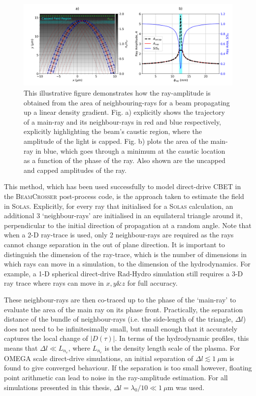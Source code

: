\begin{figure}[t!]
    \includegraphics[width=\linewidth]{Numerics/Images/FieldCap_Diagram.png}
    \centering
    \caption{This illustrative figure demonstrates how the ray-amplitude is obtained from the area of neighbouring-rays for a beam propagating up a linear density gradient.
    Fig. a) explicitly shows the trajectory of a main-ray and its neighbour-rays in red and blue respectively, explicitly highlighting the beam's caustic region, where the amplitude of the light is capped.
    Fig. b) plots the area of the main-ray in blue, which goes through a minimum at the caustic location as a function of the phase of the ray.
    Also shown are the uncapped and capped amplitudes of the ray.}%
    \label{fig:SOLAS_fieldcap_diagram}
\end{figure}

This method, which has been used successfully to model direct-drive \ac{CBET} in the \textsc{BeamCrosser} post-process code, is the approach taken to estimate the field in \textsc{Solas}.
Explicitly, for every ray that initialised for a \textsc{Solas} calculation, an additional 3 `neighbour-rays' are initialised in an equilateral triangle around it, perpendicular to the initial direction of propagation at a random angle.
Note that when a 2-D ray-trace is used, only 2 neighbour-rays are required as the rays cannot change separation in the out of plane direction.
It is important to distinguish the dimension of the ray-trace, which is the number of dimensions in which rays can move in a simulation, to the dimension of the hydrodynamics.
For example, a 1-D spherical direct-drive \ac{Rad-Hydro} simulation still requires a 3-D ray trace where rays can move in $x,y\&z$ for full accuracy.

These neighbour-rays are then co-traced up to the phase of the `main-ray' to evaluate the area of the main ray on its phase front.
Practically, the separation distance of the bundle of neighbour-rays (i.e. the side-length of the triangle, $\Delta l$) does not need to be infinitesimally small, but small enough that it accurately captures the local change of $|D(\tau)|$.
In terms of the hydrodynamic profiles, this means that $\Delta l \ll L_{n_e}$, where $L_{n_e}$ is the density length scale of the plasma.
For OMEGA scale direct-drive simulations, an initial separation of $\Delta l\lesssim 1\ \mu\text{m}$ is found to give converged behaviour.
If the separation is too small however, floating point arithmetic can lead to noise in the ray-amplitude estimation.
For all simulations presented in this thesis, $\Delta l=\lambda_0/10\ll1\ \mu\text{m}$ was used.

